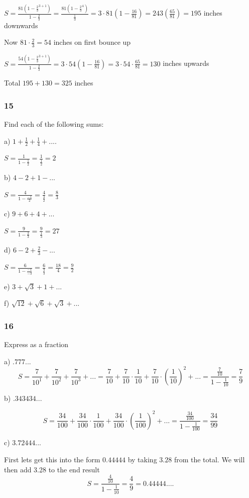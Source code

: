 \documentclass[]{report}
\begin{document}
$S = \frac{81(1 - \frac{2}{3}^{3+1})}{1-\frac{2}{3}} = \frac{81(1 - \frac{2}{3}^4)}{\frac{1}{3}} = 3 \cdot 81(1 - \frac{16}{81}) = 243 (\frac{65}{81}) = 195 $ inches downwards

Now $81 \cdot \frac{2}{3} = 54$ inches on first bounce up


$S = \frac{54(1 - \frac{2}{3}^{3+1})}{1-\frac{2}{3}} = 3 \cdot 54 (1 - \frac{16}{81})  = 3 \cdot 54 \cdot \frac{65}{81} = 130$ inches upwards

Total $195 + 130 =  325 $ inches

\subsubsection{15}
Find each of the following sums:

a) $1 + \frac{1}{2} + \frac{1}{4} + ....$

$ S = \frac{1}{1-\frac{1}{2}} = \frac{1}{\frac{1}{2}} = 2$

b) $ 4 - 2 + 1 - ...$

$S = \frac{4}{1-\frac{-1}{2}} = \frac{4}{\frac{3}{2}} = \frac{8}{3}$

c) $9 + 6 + 4 + ...$

$ S = \frac{9}{1 - \frac{2}{3}} = \frac{9}{\frac{1}{3}} = 27$

d) $6 - 2 + \frac{2}{3} - ... $

$S = \frac{6}{1 - \frac{-1}{-3}} = \frac{6}{\frac{4}{3}} = \frac{18}{4} = \frac{9}{2}$

e) $3 + \sqrt{3} + 1 + ... $

f) $\sqrt{12} + \sqrt{6} + \sqrt{3} + ... $

\subsubsection{16}

Express as a fraction

a) $.777...$
\[
S = \frac{7}{10^1} + \frac{7}{10^2} + \frac{7}{10^3} + ... = \frac{7}{10} + \frac{7}{10}\cdot\frac{1}{10} + \frac{7}{10}\cdot(\frac{1}{10})^2 + ... = \frac{\frac{7}{10}}{1 - \frac{1}{10}}  = \frac{7}{9}
\]

b) $.343434...$

\[
S = \frac{34}{100} + \frac{34}{100} \cdot \frac{1}{100} + \frac{34}{100} \cdot (\frac{1}{100})^2 + ... = \frac{\frac{34}{100}}{1-\frac{1}{100}} = \frac{34}{99}
\]

c) $3.72444...$

First lets get this into the form $0.44444$ by taking $3.28$ from the total. We will then add 3.28 to the end result
\[
S = \frac{\frac{4}{10}}{1- \frac{1}{10}} = \frac{4}{9} = 0.44444....
\]
\end{document}

